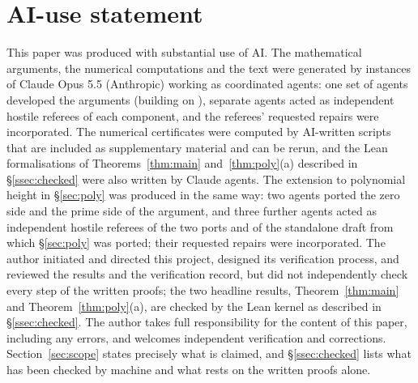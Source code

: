 \documentclass[11pt]{amsart}
\theoremstyle{definition}
\theoremstyle{remark}
\numberwithin{equation}{section}
\newcommand{\inputlemma}[1]{}
\begin{document}
\inputlemma{polyheight}

\section*{AI-use statement}
This paper was produced with substantial use of AI. The mathematical arguments, the numerical computations and the text were generated by instances of Claude Opus 5.5 (Anthropic) working as coordinated agents: one set of agents developed the arguments (building on \cite{AF26,HY26}), separate agents acted as independent hostile referees of each component, and the referees' requested repairs were incorporated. The numerical certificates were computed by AI-written scripts that are included as supplementary material and can be rerun, and the Lean formalisations of Theorems~\ref{thm:main} and~\ref{thm:poly}(a) described in \S\ref{ssec:checked} were also written by Claude agents. The extension to polynomial height in \S\ref{sec:poly} was produced in the same way: two agents ported the zero side and the prime side of the argument, and three further agents acted as independent hostile referees of the two ports and of the standalone draft from which \S\ref{sec:poly} was ported; their requested repairs were incorporated. The author initiated and directed this project, designed its verification process, and reviewed the results and the verification record, but did not independently check every step of the written proofs; the two headline results, Theorem~\ref{thm:main} and Theorem~\ref{thm:poly}(a), are checked by the Lean kernel as described in \S\ref{ssec:checked}. The author takes full responsibility for the content of this paper, including any errors, and welcomes independent verification and corrections. Section~\ref{sec:scope} states precisely what is claimed, and \S\ref{ssec:checked} lists what has been checked by machine and what rests on the written proofs alone.

\appendix

\end{document}
